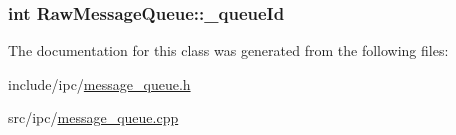 \hypertarget{classRawMessageQueue_457f069a4d7f9b7adcadee8af2ddb4cd}{
\subsubsection[{\_\-queueId}]{\setlength{\rightskip}{0pt plus 5cm}int {\bf RawMessageQueue::\_\-queueId}}}
\label{classRawMessageQueue_457f069a4d7f9b7adcadee8af2ddb4cd}




The documentation for this class was generated from the following files:\begin{CompactItemize}
\item 
include/ipc/\hyperlink{message__queue_8h}{message\_\-queue.h}\item 
src/ipc/\hyperlink{message__queue_8cpp}{message\_\-queue.cpp}\end{CompactItemize}
